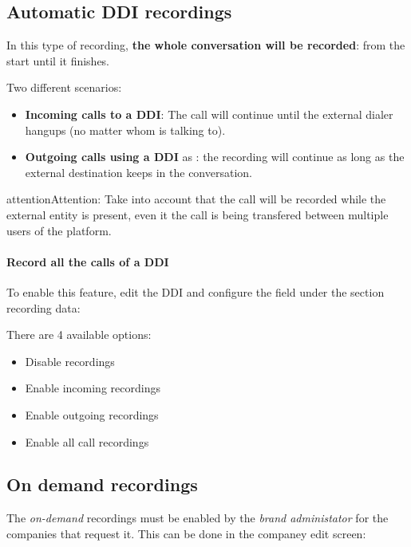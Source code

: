 \documentclass[letterpaper,10pt,english]{sphinxmanual}
\begin{document}
\subsection{Automatic DDI recordings}
\label{pbx_features/call_recording:automatic-ddi-recordings}
In this type of recording, \textbf{the whole conversation will be recorded}: from
the start until it finishes.

Two different scenarios:
\begin{itemize}
\item {} 
\textbf{Incoming calls to a DDI}: The call will continue until the external
dialer hangups (no matter whom is talking to).

\item {} 
\textbf{Outgoing calls using a DDI} as {\hyperref[pbx_features/external_ddis:external\string-ddis]{}}: the
recording will continue as long as the external destination keeps in the
conversation.

\end{itemize}

\begin{notice}{attention}{Attention:}
Take into account that the call will be recorded while the
external entity is present, even it the call is being transfered between
multiple users of the platform.
\end{notice}
\paragraph{Record all the calls of a DDI}

To enable this feature, edit the DDI and configure the field under the section
recording data:

\noindent{}

There are 4 available options:
\begin{itemize}
\item {} 
Disable recordings

\item {} 
Enable incoming recordings

\item {} 
Enable outgoing recordings

\item {} 
Enable all call recordings

\end{itemize}


\subsection{On demand recordings}
\label{pbx_features/call_recording:on-demand-recordings}
The \emph{on-demand} recordings must be enabled by the \emph{brand administator} for the
companies that request it. This can be done in the companey edit screen:
\end{document}
